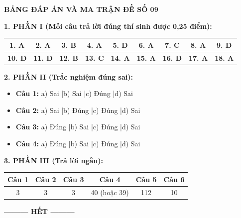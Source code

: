 \documentclass[12pt,a4paper]{article}
\begin{document}
\newpage
\begin{center}
	{\color{hfRed}\textbf{\Large BẢNG ĐÁP ÁN VÀ MA TRẬN ĐỀ SỐ 09}}
\end{center}

\smallskip
\noindent
\textbf{1. PHẦN I (Mỗi câu trả lời đúng thí sinh được 0,25 điểm):}
\begin{center}
\begin{tabular}{|c|c|c|c|c|c|c|c|c|}
\hline
\textbf{1. A} & \textbf{2. A} & \textbf{3. B} & \textbf{4. A} & \textbf{5. D} & \textbf{6. A} & \textbf{7. C} & \textbf{8. A} & \textbf{9. D} \\ \hline
\textbf{10. D} & \textbf{11. D} & \textbf{12. B} & \textbf{13. C} & \textbf{14. A} & \textbf{15. A} & \textbf{16. D} & \textbf{17. A} & \textbf{18. A} \\ \hline
\end{tabular}
\end{center}

\noindent
\textbf{2. PHẦN II (Trắc nghiệm đúng sai):}
\begin{itemize}
	\item \textbf{Câu 1:} a) Sai \quad|\quad b) Sai \quad|\quad c) Đúng \quad|\quad d) Sai
	\item \textbf{Câu 2:} a) Sai \quad|\quad b) Đúng \quad|\quad c) Đúng \quad|\quad d) Sai
	\item \textbf{Câu 3:} a) Đúng \quad|\quad b) Sai \quad|\quad c) Đúng \quad|\quad d) Sai
	\item \textbf{Câu 4:} a) Đúng \quad|\quad b) Sai \quad|\quad c) Đúng \quad|\quad d) Sai
\end{itemize}

\noindent
\textbf{3. PHẦN III (Trả lời ngắn):}
\begin{center}
\begin{tabular}{|c|c|c|c|c|c|}
\hline
\textbf{Câu 1} & \textbf{Câu 2} & \textbf{Câu 3} & \textbf{Câu 4} & \textbf{Câu 5} & \textbf{Câu 6} \\ \hline
3 & 3 & 3 & 40 (hoặc 39) & 112 & 10 \\ \hline
\end{tabular}
\end{center}

\begin{center}
\textbf{--------- HẾT ---------}
\end{center}
\end{document}
